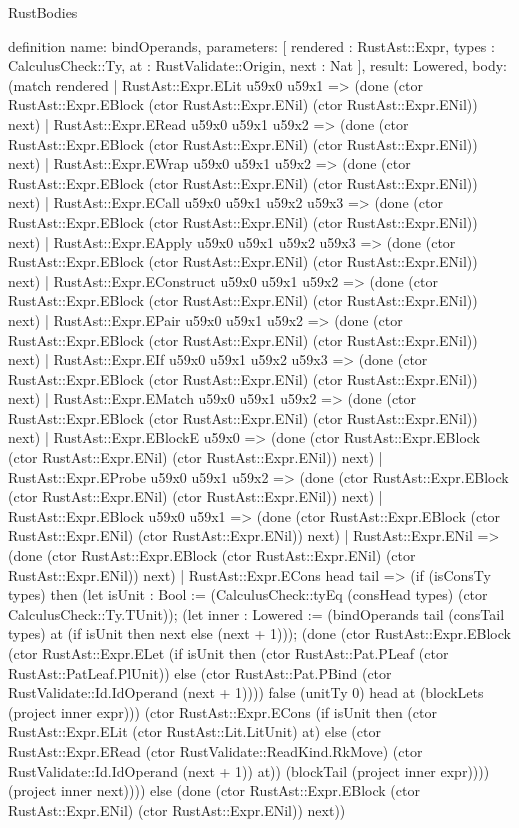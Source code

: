 \begin{lexlean}{RustBodies}
\begin{semanticmodule}
definition{
  name: bindOperands,
  parameters: [
    rendered : RustAst::Expr,
    types : CalculusCheck::Ty,
    at : RustValidate::Origin,
    next : Nat
  ],
  result: Lowered,
  body: (match rendered
    | RustAst::Expr.ELit u59x0 u59x1 => (done (ctor RustAst::Expr.EBlock (ctor RustAst::Expr.ENil) (ctor RustAst::Expr.ENil)) next)
    | RustAst::Expr.ERead u59x0 u59x1 u59x2 => (done (ctor RustAst::Expr.EBlock (ctor RustAst::Expr.ENil) (ctor RustAst::Expr.ENil)) next)
    | RustAst::Expr.EWrap u59x0 u59x1 u59x2 => (done (ctor RustAst::Expr.EBlock (ctor RustAst::Expr.ENil) (ctor RustAst::Expr.ENil)) next)
    | RustAst::Expr.ECall u59x0 u59x1 u59x2 u59x3 => (done (ctor RustAst::Expr.EBlock (ctor RustAst::Expr.ENil) (ctor RustAst::Expr.ENil)) next)
    | RustAst::Expr.EApply u59x0 u59x1 u59x2 u59x3 => (done (ctor RustAst::Expr.EBlock (ctor RustAst::Expr.ENil) (ctor RustAst::Expr.ENil)) next)
    | RustAst::Expr.EConstruct u59x0 u59x1 u59x2 => (done (ctor RustAst::Expr.EBlock (ctor RustAst::Expr.ENil) (ctor RustAst::Expr.ENil)) next)
    | RustAst::Expr.EPair u59x0 u59x1 u59x2 => (done (ctor RustAst::Expr.EBlock (ctor RustAst::Expr.ENil) (ctor RustAst::Expr.ENil)) next)
    | RustAst::Expr.EIf u59x0 u59x1 u59x2 u59x3 => (done (ctor RustAst::Expr.EBlock (ctor RustAst::Expr.ENil) (ctor RustAst::Expr.ENil)) next)
    | RustAst::Expr.EMatch u59x0 u59x1 u59x2 => (done (ctor RustAst::Expr.EBlock (ctor RustAst::Expr.ENil) (ctor RustAst::Expr.ENil)) next)
    | RustAst::Expr.EBlockE u59x0 => (done (ctor RustAst::Expr.EBlock (ctor RustAst::Expr.ENil) (ctor RustAst::Expr.ENil)) next)
    | RustAst::Expr.EProbe u59x0 u59x1 u59x2 => (done (ctor RustAst::Expr.EBlock (ctor RustAst::Expr.ENil) (ctor RustAst::Expr.ENil)) next)
    | RustAst::Expr.EBlock u59x0 u59x1 => (done (ctor RustAst::Expr.EBlock (ctor RustAst::Expr.ENil) (ctor RustAst::Expr.ENil)) next)
    | RustAst::Expr.ENil => (done (ctor RustAst::Expr.EBlock (ctor RustAst::Expr.ENil) (ctor RustAst::Expr.ENil)) next)
    | RustAst::Expr.ECons head tail => (if (isConsTy types) then (let isUnit : Bool := (CalculusCheck::tyEq (consHead types) (ctor CalculusCheck::Ty.TUnit)); (let inner : Lowered := (bindOperands tail (consTail types) at (if isUnit then next else (next + 1))); (done (ctor RustAst::Expr.EBlock (ctor RustAst::Expr.ELet (if isUnit then (ctor RustAst::Pat.PLeaf (ctor RustAst::PatLeaf.PlUnit)) else (ctor RustAst::Pat.PBind (ctor RustValidate::Id.IdOperand (next + 1)))) false (unitTy 0) head at (blockLets (project inner expr))) (ctor RustAst::Expr.ECons (if isUnit then (ctor RustAst::Expr.ELit (ctor RustAst::Lit.LitUnit) at) else (ctor RustAst::Expr.ERead (ctor RustValidate::ReadKind.RkMove) (ctor RustValidate::Id.IdOperand (next + 1)) at)) (blockTail (project inner expr)))) (project inner next)))) else (done (ctor RustAst::Expr.EBlock (ctor RustAst::Expr.ENil) (ctor RustAst::Expr.ENil)) next))
}
\end{semanticmodule}
\end{lexlean}

